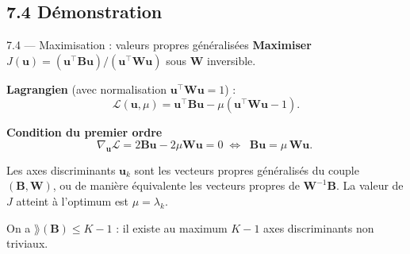 \subsection{7.4 Démonstration}
\begin{frame}{7.4 — Maximisation : valeurs propres généralisées}
\textbf{Maximiser} $J(\mathbf{u}) = (\mathbf{u}^\top \mathbf{B} \mathbf{u}) / (\mathbf{u}^\top \mathbf{W} \mathbf{u})$
sous $\mathbf{W}$ inversible.

\medskip
\textbf{Lagrangien} (avec normalisation $\mathbf{u}^\top \mathbf{W} \mathbf{u} = 1$) :
\[
\mathcal{L}(\mathbf{u}, \mu) = \mathbf{u}^\top \mathbf{B} \mathbf{u} - \mu (\mathbf{u}^\top \mathbf{W} \mathbf{u} - 1).
\]

\textbf{Condition du premier ordre}
\[
\nabla_{\mathbf{u}} \mathcal{L} = 2\mathbf{B}\mathbf{u} - 2\mu \mathbf{W}\mathbf{u} = 0
\;\Longleftrightarrow\;
\boxed{\;\mathbf{B}\mathbf{u} = \mu\, \mathbf{W}\mathbf{u}.\;}
\]

\begin{theorem}[Solution]
Les axes discriminants $\mathbf{u}_k$ sont les \alert{vecteurs propres généralisés}
du couple $(\mathbf{B}, \mathbf{W})$, ou de manière équivalente les
vecteurs propres de $\mathbf{W}^{-1}\mathbf{B}$.
La valeur de $J$ atteint à l'optimum est $\mu = \lambda_k$.
\end{theorem}

\begin{rema}
\small On a $\rang(\mathbf{B}) \leq K - 1$ : il existe au maximum $K-1$ axes
discriminants non triviaux.
\end{rema}
\end{frame}

